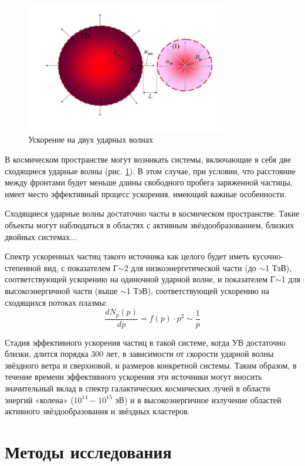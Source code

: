 \documentclass[a4paper,14pt]{extarticle} %
\begin{document}
\begin{figure}[H]
\centering
\includegraphics[width=250pt]{two_shocks}
\caption{Ускорение на двух ударных волнах}
\label{intro/two}
\end{figure}
В космическом пространстве могут возникать системы, включающие в себя две сходящиеся ударные волны (рис. \ref{intro/two}). В этом случае, при условии, что расстояние между фронтами будет меньше длины свободного пробега заряженной частицы, имеет место эффективный процесс ускорения, имеющий важные особенности. \cite{Glad1}\cite{Glad2}\cite{Glad3}

Сходящиеся ударные волны достаточно часты в космическом пространстве. Такие объекты могут наблюдаться в областях с активным звёздообразованием, близких двойных системах...

Спектр ускоренных частиц такого источника как целого будет иметь кусочно-степенной вид, с показателем Г$\sim$2 для низкоэнергетической части (до $\sim$1 ТэВ), соответствующей ускорению на одиночной ударной волне, и показателем Г$\sim$1 для высокоэнергичной части (выше $\sim$1 ТэВ), соответствующей ускорению на сходящихся потоках плазмы:
\begin{equation}
\frac{dN_p(p)}{dp} = f(p)\cdot p^2 \sim \frac{1}{p}
\end{equation}

Стадия эффективного ускорения частиц в такой системе, когда УВ достаточно близки, длится порядка 300 лет, в зависимости от скорости ударной волны звёздного ветра и сверхновой, и размеров конкретной системы. Таким  образом, в течение времени эффективного ускорения эти источники могут вносить значительный вклад в спектр галактических  космических лучей  в   области  энергий «колена»   ($10^{14} -10^{15}$ эВ) и в высокоэнергичное излучение областей активного звёздообразования и звёздных кластеров.

\section{Методы исследования}
\end{document}
